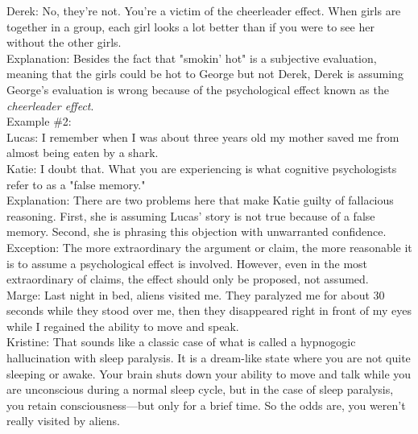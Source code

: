 \documentclass[a4paper,12pt,single,pdftex]{scrartcl}
\begin{document}
    
      Derek: No, they're not. You're a victim of the cheerleader effect. When girls are together in a group, each girl looks a lot better than if you were to see her without the other girls.
    \\

    
      Explanation: Besides the fact that "smokin' hot" is a subjective evaluation, meaning that the girls could be hot to George but not Derek, Derek is assuming George's evaluation is wrong because of the psychological effect known as the {\it cheerleader effect}.
    \\

    
      Example \#2:
    \\

    
      Lucas: I remember when I was about three years old my mother saved me from almost being eaten by a shark.
    \\

    
      Katie: I doubt that. What you are experiencing is what cognitive psychologists refer to as a "false memory."
    \\

    
      Explanation: There are two problems here that make Katie guilty of fallacious reasoning. First, she is assuming Lucas' story is not true because of a false memory. Second, she is phrasing this objection with unwarranted confidence.
    \\

    
      Exception: The more extraordinary the argument or claim, the more reasonable it is to assume a psychological effect is involved. However, even in the most extraordinary of claims, the effect should only be proposed, not assumed.
    \\

    
      Marge: Last night in bed, aliens visited me. They paralyzed me for about 30 seconds while they stood over me, then they disappeared right in front of my eyes while I regained the ability to move and speak.
    \\

    
      Kristine: That sounds like a classic case of what is called a hypnogogic hallucination with sleep paralysis. It is a dream-like state where you are not quite sleeping or awake. Your brain shuts down your ability to move and talk while you are unconscious during a normal sleep cycle, but in the case of sleep paralysis, you retain consciousness—but only for a brief time. So the odds are, you weren't really visited by aliens.
    \\
\end{document}
